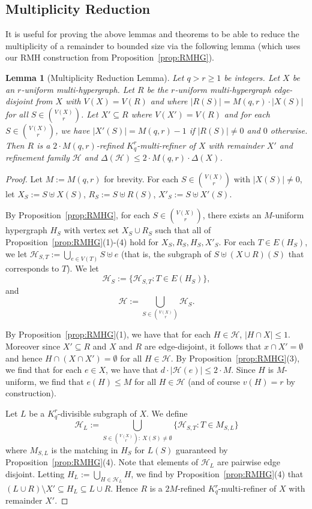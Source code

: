 \documentclass[11pt]{article}
\newcounter{i}
\theoremstyle{plain}
\newtheorem{lem}[thm]{Lemma}
\theoremstyle{plain} %
\theoremstyle{definition}
\begin{document}
\subsection{Multiplicity Reduction}\label{ss:MRL}

It is useful for proving the above lemmas and theorems to be able to reduce the multiplicity of a remainder to bounded size via the following lemma (which uses our RMH construction from Proposition~\ref{prop:RMHG}).

\begin{lem}[Multiplicity Reduction Lemma]\label{lem:MRL}
Let $q > r\ge 1$ be integers. Let $X$ be an $r$-uniform multi-hypergraph. Let $R$ be the $r$-uniform multi-hypergraph edge-disjoint from $X$ with $V(X)=V(R)$ and where $|R(S)|= M(q,r)\cdot |X(S)|$ for all $S\in \binom{V(X)}{r}$. Let $X'\subseteq R$ where $V(X')=V(R)$ and for each $S\in \binom{V(X)}{r}$, we have $|X'(S)| = M(q,r)-1$ if $|R(S)|\ne 0$ and $0$ otherwise. Then $R$ is a $2\cdot M(q,r)$-refined $K_q^r$-multi-refiner of $X$ with remainder $X'$ and refinement family $\mathcal{H}$ and  $\Delta(\mathcal{H}) \le 2\cdot M(q,r)\cdot \Delta(X)$. %
\end{lem}
\begin{proof}%
Let $M:= M(q,r)$ for brevity. For each $S\in \binom{V(X)}{r}$ with $|X(S)|\ne 0$, let $X_S :=S\uplus X(S)$, $R_S:= S\uplus R(S)$, $X'_S := S\uplus X'(S)$.

By Proposition~\ref{prop:RMHG}, for each $S\in \binom{V(X)}{r}$, there exists an $M$-uniform hypergraph $H_S$ with vertex set $X_S\cup R_S$ such that all of Proposition~\ref{prop:RMHG}(1)-(4) hold for $X_S, R_S, H_S, X'_S$. For each $T\in E(H_S)$, we let $\mathcal{H}_{S,T} := \bigcup_{e\in V(T)} S\uplus e$ (that is, the subgraph of $S\uplus (X\cup R)(S)$ that corresponds to $T$). We let
$$\mathcal{H}_S := \{ \mathcal{H}_{S,T}: T\in E(H_S)\},$$
and
$$\mathcal{H} := \bigcup_{S \in \binom{V(X)}{r}} \mathcal{H}_S. $$

By Proposition~\ref{prop:RMHG}(1), we have that for each $H\in\mathcal{H}$, $|H\cap X|\le 1$. Moreover since $X'\subseteq R$ and $X$ and $R$ are edge-disjoint, it follows that $x\cap X'=\emptyset$ and hence $H\cap (X\cap X')=\emptyset$ for all $H\in \mathcal{H}$. By Proposition~\ref{prop:RMHG}(3), we find that for each $e\in X$, we have that $d\cdot |\mathcal{H}(e)|\le  2\cdot M$. Since $H$ is $M$-uniform, we find that $e(H)\le M$ for all $H \in \mathcal{H}$ (and of course $v(H)=r$ by construction). 

Let $L$ be a $K_q^r$-divisible subgraph of $X$. We define
$$\mathcal{H}_L:= \bigcup_{S\in \binom{V(X)}{r}:~X(S)\ne \emptyset} \{ \mathcal{H}_{S,T}: T\in M_{S,L}\}$$
where $M_{S,L}$ is the matching in $H_S$ for $L(S)$ guaranteed by Proposition~\ref{prop:RMHG}(4).
Note that elements of $\mathcal{H}_L$ are pairwise edge disjoint. Letting $H_L := \bigcup_{H\in \mathcal{H}_L} H$, we find by Proposition~\ref{prop:RMHG}(4) that $(L\cup R)\setminus X' \subseteq H_L \subseteq L\cup R$. Hence $R$ is a $2M$-refined $K_q^r$-multi-refiner of $X$ with remainder $X'$.
\end{proof}
\end{document}
